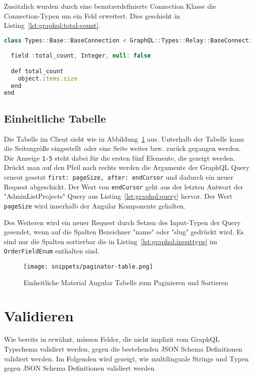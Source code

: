 Zusätzlich wurden durch eine benutzerdefinierte Connection Klasse die Connection-Typen um ein Feld erweitert.
Dies geschieht in Listing~\ref{lst:graphql:total-count}.

\begin{lstlisting}[language=JavaScript,float=h!,caption={Benutzerdefinierte Connection Klasse mit hinzugefügtem Feld}, label={lst:graphql:total-count}]
class Types::Base::BaseConnection < GraphQL::Types::Relay::BaseConnection

  field :total_count, Integer, null: false

  def total_count
    object.items.size
  end
end
\end{lstlisting}

\subsection{Einheitliche Tabelle}
\label{impl:paginator-component}
Die Tabelle im Client sieht wie in Abbildung~\ref{impl:graphql:paginator-table} aus. Unterhalb der Tabelle kann die Seitengröße eingestellt oder eine Seite weiter bzw. zurück gegangen werden. Die Anzeige \texttt{1-5} steht dabei für die ersten fünf Elemente, die gezeigt werden. Drückt man auf den Pfeil nach rechts werden die Argumente der GraphQL Query erneut gesetzt \texttt{{first: pageSize, after: endCursor}} und dadurch ein neuer Request abgeschickt.
Der Wert von \texttt{endCursor} geht aus der letzten Antwort der "AdminListProjects" Query aus Listing~\ref{lst:graphql:query} hervor. Der Wert \texttt{pageSize} wird innerhalb der Angular Komponente gehalten. 

Des Weiteren wird ein neuer Request durch Setzen des Input-Typen der Query gesendet, wenn auf die Spalten Bezeichner "name" oder "slug" gedrückt wird. Es sind nur die Spalten sortierbar die in Listing~\ref{lst:graphql:inputtype} im \texttt{OrderFieldEnum} enthalten sind.

\begin{figure}[h!]
	\centering
	\texttt{[image: snippets/paginator-table.png]}
	\caption{Einheitliche Material Angular Tabelle zum Paginieren und Sortieren}
	\label{impl:graphql:paginator-table}
\end{figure}

\section{Validieren}
\label{graphql:validation}
Wie bereits in  erwähnt, müssen Felder, die nicht implizit vom GraphQL Typschema validiert werden, gegen die bestehenden JSON Schema Definitionen validiert werden. Im Folgenden wird gezeigt, wie multilinguale Strings und Typen gegen JSON Schema Definitionen validiert werden.

